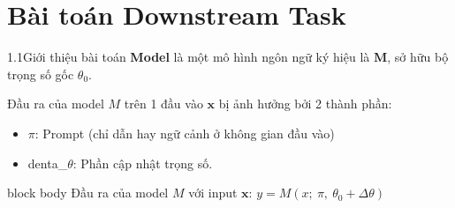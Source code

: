 \section{Bài toán Downstream Task}


\begin{frame}{1.1\quad Giới thiệu bài toán}
  \vspace{0.3em}
  {\color{Amber!80!black}\textbf{Model}} là một mô hình ngôn ngữ ký hiệu là $\mathbf{M}$,
  sở hữu bộ trọng số gốc $\theta_0$.

  \vspace{0.6em}
  Đầu ra của model $M$ trên 1 đầu vào $\mathbf{x}$ bị ảnh hưởng bởi 2 thành phần:
  \begin{itemize}\tightlist
    \item $\pi$: Prompt (chỉ dẫn hay ngữ cảnh ở không gian đầu vào)
    \item denta\_$\theta$: Phần cập nhật trọng số.
  \end{itemize}

  \vspace{0.8em}
  \begin{beamercolorbox}[wd=\linewidth,sep=0.7em]{block body}
    Đầu ra của model $M$ với input $\mathbf{x}$:\qquad
    {\large\color{PaperGreen} $y = M(x;\ \pi,\ \theta_0 + \Delta\theta)$}
  \end{beamercolorbox}
\end{frame}

